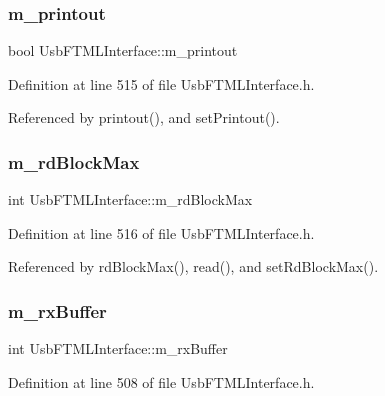 \subsubsection{\texorpdfstring{m\+\_\+printout}{m\_printout}}
{\footnotesize\ttfamily bool Usb\+F\+T\+M\+L\+Interface\+::m\+\_\+printout\hspace{0.3cm}{\ttfamily [private]}}



Definition at line 515 of file Usb\+F\+T\+M\+L\+Interface.\+h.



Referenced by printout(), and set\+Printout().

\mbox{\label{classUsbFTMLInterface_af950506bbfb1e198af7ea2141058d018}} 
\subsubsection{\texorpdfstring{m\+\_\+rd\+Block\+Max}{m\_rdBlockMax}}
{\footnotesize\ttfamily int Usb\+F\+T\+M\+L\+Interface\+::m\+\_\+rd\+Block\+Max\hspace{0.3cm}{\ttfamily [private]}}



Definition at line 516 of file Usb\+F\+T\+M\+L\+Interface.\+h.



Referenced by rd\+Block\+Max(), read(), and set\+Rd\+Block\+Max().

\mbox{\label{classUsbFTMLInterface_a8f0f8bb2a4fe14ca4890695f41fbcbf8}} 
\subsubsection{\texorpdfstring{m\+\_\+rx\+Buffer}{m\_rxBuffer}}
{\footnotesize\ttfamily int Usb\+F\+T\+M\+L\+Interface\+::m\+\_\+rx\+Buffer\hspace{0.3cm}{\ttfamily [private]}}



Definition at line 508 of file Usb\+F\+T\+M\+L\+Interface.\+h.



